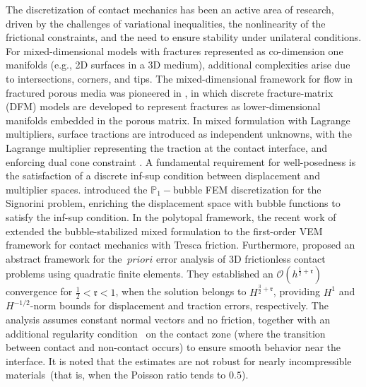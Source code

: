 \documentclass[a4paper,11pt]{article}
\theoremstyle{definition}
\theoremstyle{remark}
\def\fr{\mathfrak{r}}
\begin{document}
The discretization of contact mechanics has been an active area of research, driven by the challenges of variational inequalities, the nonlinearity of the frictional constraints, and the need to ensure stability under unilateral conditions. For mixed-dimensional models with fractures represented as co-dimension one manifolds (e.g., 2D surfaces in a 3D medium), additional complexities arise due to intersections, corners, and tips. The mixed-dimensional framework for flow in fractured porous media was pioneered in \cite{MJE05,MAE02}, in which discrete fracture-matrix (DFM) models are developed to represent fractures as lower-dimensional manifolds embedded in the porous matrix. In mixed formulation with Lagrange multipliers, surface tractions are introduced as independent unknowns, with the Lagrange multiplier representing the traction at the contact interface, and enforcing dual cone constraint \cite{brezzifortin,alart}. A fundamental requirement for well-posedness is the satisfaction of a discrete inf-sup condition between displacement and multiplier spaces.
\cite{BR2003} introduced the $\mathbb{P}_1-$bubble FEM discretization for the Signorini problem, enriching the displacement space with bubble functions to satisfy the inf-sup condition. In the polytopal framework, the recent work of \cite{jhr} extended the bubble-stabilized mixed formulation to the first-order VEM framework for contact mechanics with Tresca friction.
Furthermore, \cite{wohlmuthquadraticcontact} proposed an abstract framework for the $~ priori$ error analysis of 3D frictionless contact problems using quadratic finite elements. They established an $\mathcal{O}(h^{\frac12+\fr})$ convergence for $\frac12 <\fr<1$, when the solution belongs to $H^{\frac32+\fr}$, providing $H^1$ and $H^{-1/2}$-norm bounds for displacement and traction errors, respectively. The analysis assumes constant normal vectors and no friction, together with an additional regularity condition~\cite[Assumption~4]{wohlmuthquadraticcontact} on the contact zone (where the transition between contact and non-contact occurs) to ensure smooth behavior near the interface. It is noted that the estimates are not robust for nearly incompressible materials~(that is, when the Poisson ratio tends to $0.5$).
\end{document}
